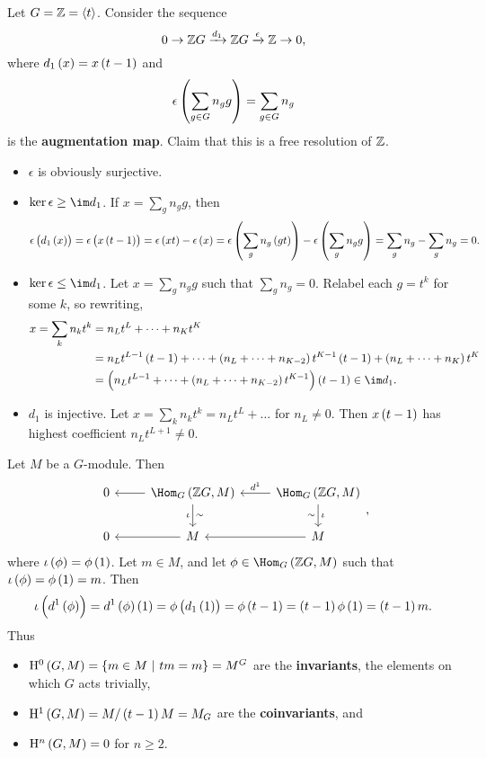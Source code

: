 \begin{example}
Let $ G = \mathbb{Z} = \left\langle t \right\rangle $. Consider the sequence
$$ 0 \to \mathbb{Z} G \xrightarrow{d_1} \mathbb{Z} G \xrightarrow{\epsilon} \mathbb{Z} \to 0, $$
where $ d_1\br{x} = x\br{t - 1} $ and
$$ \epsilon\br{\sum_{g \in G} n_gg} = \sum_{g \in G} n_g $$
is the \textbf{augmentation map}. Claim that this is a free resolution of $ \mathbb{Z} $.
\begin{itemize}
\item $ \epsilon $ is obviously surjective.
\item $ \ker \epsilon \ge \im d_1 $. If $ x = \sum_g n_gg $, then
$$ \epsilon\br{d_1\br{x}} = \epsilon\br{x\br{t - 1}} = \epsilon\br{xt} - \epsilon\br{x} = \epsilon\br{\sum_g n_g\br{gt}} - \epsilon\br{\sum_g n_gg} = \sum_g n_g - \sum_g n_g = 0. $$
\item $ \ker \epsilon \le \im d_1 $. Let $ x = \sum_g n_gg $ such that $ \sum_g n_g = 0 $. Relabel each $ g = t^k $ for some $ k $, so rewriting,
\begin{align*}
x
= \sum_k n_kt^k
& = n_Lt^L + \dots + n_Kt^K \\
& = n_Lt^{L - 1}\br{t - 1} + \dots + \br{n_L + \dots + n_{K - 2}}t^{K - 1}\br{t - 1} + \br{n_L + \dots + n_K}t^K \\
& = \br{n_Lt^{L - 1} + \dots + \br{n_L + \dots + n_{K - 2}}t^{K - 1}}\br{t - 1}
\in \im d_1.
\end{align*}
\item $ d_1 $ is injective. Let $ x = \sum_k n_kt^k = n_Lt^L + \dots $ for $ n_L \ne 0 $. Then $ x\br{t - 1} $ has highest coefficient $ n_Lt^{L + 1} \ne 0 $.
\end{itemize}

\pagebreak

Let $ M $ be a $ G $-module. Then
$$
\begin{tikzcd}
0 & \Hom_G\br{\ZZ G, M} \arrow{l} \arrow{d}{\sim}[swap]{\iota} & \Hom_G\br{\ZZ G, M} \arrow{l}[swap]{d^1} \arrow{d}{\iota}[swap]{\sim} \\
0 & M \arrow{l} & M \arrow{l}
\end{tikzcd},
$$
where $ \iota\br{\phi} = \phi\br{1} $. Let $ m \in M $, and let $ \phi \in \Hom_G\br{\ZZ G, M} $ such that $ \iota\br{\phi} = \phi\br{1} = m $. Then
$$ \iota\br{d^1\br{\phi}} = d^1\br{\phi}\br{1} = \phi\br{d_1\br{1}} = \phi\br{t - 1} = \br{t - 1}\phi\br{1} = \br{t - 1}m. $$
Thus
\begin{itemize}
\item $ \H^0\br{G, M} = \cbr{m \in M \st tm = m} = M^G $ are the \textbf{invariants}, the elements on which $ G $ acts trivially,
\item $ \H^1\br{G, M} = M / \br{t - 1}M = M_G $ are the \textbf{coinvariants}, and
\item $ \H^n\br{G, M} = 0 $ for $ n \ge 2 $.
\end{itemize}
\end{example}

